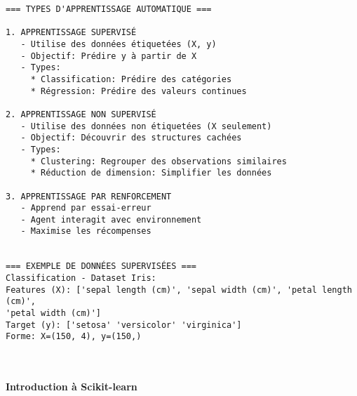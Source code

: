 \documentclass[11pt]{article}
\begin{document}
    \begin{Verbatim}[commandchars=\\\{\}]
=== TYPES D'APPRENTISSAGE AUTOMATIQUE ===

1. APPRENTISSAGE SUPERVISÉ
   - Utilise des données étiquetées (X, y)
   - Objectif: Prédire y à partir de X
   - Types:
     * Classification: Prédire des catégories
     * Régression: Prédire des valeurs continues

2. APPRENTISSAGE NON SUPERVISÉ
   - Utilise des données non étiquetées (X seulement)
   - Objectif: Découvrir des structures cachées
   - Types:
     * Clustering: Regrouper des observations similaires
     * Réduction de dimension: Simplifier les données

3. APPRENTISSAGE PAR RENFORCEMENT
   - Apprend par essai-erreur
   - Agent interagit avec environnement
   - Maximise les récompenses


=== EXEMPLE DE DONNÉES SUPERVISÉES ===
Classification - Dataset Iris:
Features (X): ['sepal length (cm)', 'sepal width (cm)', 'petal length (cm)',
'petal width (cm)']
Target (y): ['setosa' 'versicolor' 'virginica']
Forme: X=(150, 4), y=(150,)
    \end{Verbatim}

    \begin{center}
    \end{center}
    { \hspace*{\fill} \\}
    
    \paragraph{Introduction à
Scikit-learn}\label{introduction-uxe0-scikit-learn}
\end{document}

